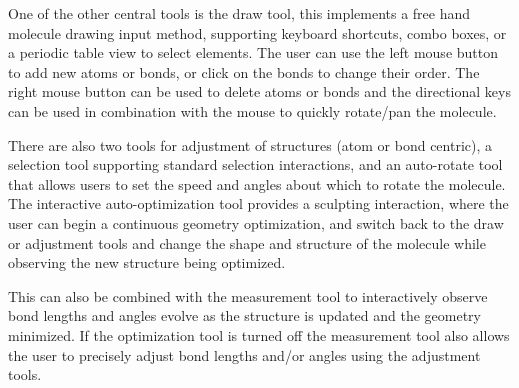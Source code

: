 \documentclass[10pt]{bmc_article}
\newenvironment{bmcformat}{\begin{raggedright}
\baselineskip20pt\sloppy\setboolean{publ}{false}}{\end{raggedright}
\baselineskip20pt\sloppy}
\begin{document}
\begin{bmcformat}
One of the other central tools is the draw tool, this implements a free hand
molecule drawing input method, supporting keyboard shortcuts, combo boxes, or a
periodic table view to select elements. The user can use the left mouse button
to add new atoms or bonds, or click on the bonds to change their order. The
right mouse button can be used to delete atoms or bonds and the directional keys
can be used in combination with the mouse to quickly rotate/pan the molecule.

There are also two tools for adjustment of structures (atom or bond centric), a
selection tool supporting standard selection interactions, and an auto-rotate
tool that allows users to set the speed and angles about which to rotate the
molecule. The interactive auto-optimization tool provides a sculpting
interaction, where the user can begin a continuous geometry optimization, and
switch back to the draw or adjustment tools and change the shape and structure
of the molecule while observing the new structure being optimized.

This can also be combined with the measurement tool to interactively observe
bond lengths and angles evolve as the structure is updated and the geometry
minimized. If the optimization tool is turned off the measurement tool also
allows the user to precisely adjust bond lengths and/or angles using the
adjustment tools.


\end{bmcformat}
\end{document}
